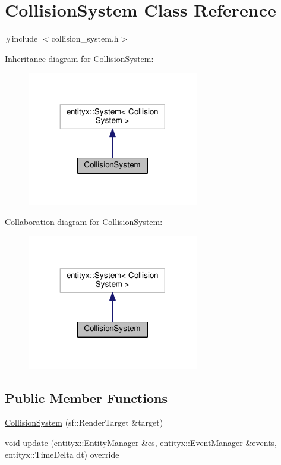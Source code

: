 \hypertarget{classCollisionSystem}{}\section{Collision\+System Class Reference}
\label{classCollisionSystem}


{\ttfamily \#include $<$collision\+\_\+system.\+h$>$}



Inheritance diagram for Collision\+System\+:
\nopagebreak
\begin{figure}[H]
\begin{center}
\leavevmode
\includegraphics[width=212pt]{classCollisionSystem__inherit__graph}
\end{center}
\end{figure}


Collaboration diagram for Collision\+System\+:
\nopagebreak
\begin{figure}[H]
\begin{center}
\leavevmode
\includegraphics[width=212pt]{classCollisionSystem__coll__graph}
\end{center}
\end{figure}
\subsection*{Public Member Functions}
\begin{DoxyCompactItemize}
\item 
\hyperlink{classCollisionSystem_a3d6fbd73a8e9e123413d8907bc4a64a6}{Collision\+System} (sf\+::\+Render\+Target \&target)
\item 
void \hyperlink{classCollisionSystem_a1206810c1190c25db4a27f70d0e8d27d}{update} (entityx\+::\+Entity\+Manager \&es, entityx\+::\+Event\+Manager \&events, entityx\+::\+Time\+Delta dt) override
\end{DoxyCompactItemize}


